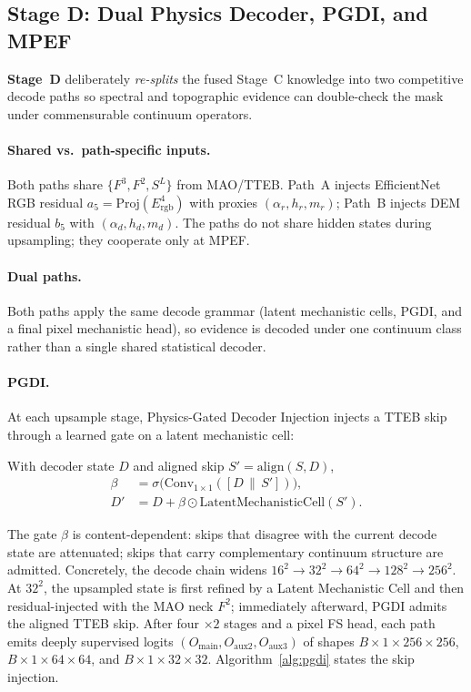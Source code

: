 \subsection{Stage D: Dual Physics Decoder, PGDI, and MPEF}
\label{sec:decode}
\textbf{Stage~D} deliberately \emph{re-splits} the fused Stage~C knowledge into two competitive decode paths so spectral and topographic evidence can double-check the mask under commensurable continuum operators.

\paragraph{Shared vs.\ path-specific inputs.}
Both paths share $\{F^{3},F^{2},S^{L}\}$ from MAO/TTEB. Path~A injects EfficientNet RGB residual $a_5=\mathrm{Proj}(E_{\mathrm{rgb}}^{4})$ with proxies $(\alpha_r,h_r,m_r)$; Path~B injects DEM residual $b_5$ with $(\alpha_d,h_d,m_d)$. The paths do not share hidden states during upsampling; they cooperate only at MPEF.

\paragraph{Dual paths.}
Both paths apply the same decode grammar (latent mechanistic cells, PGDI, and a final pixel mechanistic head), so evidence is decoded under one continuum class rather than a single shared statistical decoder.

\paragraph{PGDI.}
At each upsample stage, Physics-Gated Decoder Injection injects a TTEB skip through a learned gate on a latent mechanistic cell:
\begin{definition}[PGDI]
\label{def:pgdi}
With decoder state \(D\) and aligned skip \(S'=\mathrm{align}(S,D)\),
\begin{equation}
\label{eq:pgdi}
\begin{aligned}
\beta&=\sigma\!\bigl(
\mathrm{Conv}_{1\times1}([D\,\|\,S'])
\bigr),\\
D'&=D+\beta\odot
\mathrm{LatentMechanisticCell}(S').
\end{aligned}
\end{equation}
\end{definition}
The gate \(\beta\) is content-dependent: skips that disagree with the current decode state are attenuated; skips that carry complementary continuum structure are admitted. Concretely, the decode chain widens \(16^{2}\!\to\!32^{2}\!\to\!64^{2}\!\to\!128^{2}\!\to\!256^{2}\). At \(32^{2}\), the upsampled state is first refined by a Latent Mechanistic Cell and then residual-injected with the MAO neck \(F^{2}\); immediately afterward, PGDI admits the aligned TTEB skip. After four \(\times2\) stages and a pixel FS head, each path emits deeply supervised logits \((O_{\mathrm{main}},O_{\mathrm{aux2}},O_{\mathrm{aux3}})\) of shapes \(B{\times}1{\times}256{\times}256\), \(B{\times}1{\times}64{\times}64\), and \(B{\times}1{\times}32{\times}32\). Algorithm~\ref{alg:pgdi} states the skip injection.

